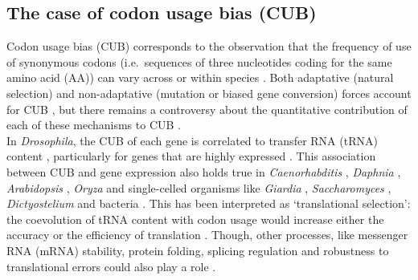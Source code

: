 \subsection{The case of codon usage bias (CUB)}

Codon usage bias (CUB) corresponds to the observation that the frequency of use of synonymous codons (i.e.\ sequences of three nucleotides coding for the same amino acid (AA)) can vary across or within species \citep{fitch1976there}.
Both adaptative (natural selection) and non-adaptative (mutation \citep{marais2001synonymous} or biased gene conversion) forces account for CUB \citep{bulmer1991selectionmutationdrift,sharp1993codon,akashi1998translational}, but there remains a controversy about the quantitative contribution of each of these mechanisms to CUB \citep{pouyet2016etude}.\\

In \textit{Drosophila}, the CUB of each gene is correlated to transfer RNA (tRNA) content \citep{akashi1994synonymous,duret1999expression,bierne2006variation,behura2011coadaptation}, particularly for genes that are highly expressed \citep{chavancy1979adaptation,shields1988silent,moriyama1997codon,hey2002interactions}.
This association between CUB and gene expression also holds true in \textit{Caenorhabditis} \citep{duret1999expression,castillo-davis2002genome,marais2002hillrobertson}, \textit{Daphnia} \citep{lynch2017population}, \textit{Arabidopsis} \citep{duret1999expression,wright2004effects}, \textit{Oryza} \citep{muyle2011gcbiased} and single-celled organisms like \textit{Giardia} \citep{lafay1999synonymous}, \textit{Saccharomyces} \citep{bennetzen1982codon,akashi2003translational,harrison2011biased}, \textit{Dictyostelium} \citep{sharp1989codon} and bacteria \citep{gouy1982codon,ikemura1985codon,sharp1987rate}.
This has been interpreted as ‘translational selection’: the coevolution of tRNA content with codon usage would increase either the accuracy or the efficiency of translation \citep{sharp1995dna,duret2002evolution}.
Though, other processes, like messenger RNA (mRNA) stability, protein folding, splicing regulation and robustness to translational errors could also play a role \citep[reviewed in \citealp{clement2017evolutionary}]{chamary2006hearing,cusack2011preventing,plotkin2011synonymous}.\\

